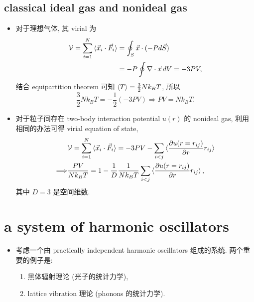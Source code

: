 \subsection{classical ideal gas and nonideal gas}
\begin{itemize}
	\item 对于理想气体, 其 virial 为
	\begin{align}
		\mathcal{V} = \sum_{i = 1}^N \braket{\vec{x}_i \cdot \vec{F}_i} &= \oint_S \vec{x} \cdot (- P d\vec{S}) \notag \\
		&= - P \oint \nabla \cdot \vec{x} \, dV = - 3 P V,
	\end{align}
	结合 equipartition theorem 可知 $\braket{T} = \frac{3}{2} N k_B T$, 所以
	\begin{equation}
		\frac{3}{2} N k_B T = - \frac{1}{2} (- 3 P V) \Longrightarrow P V = N k_B T.
	\end{equation}
	
	\item 对于粒子间存在 two-body interaction potential $u(r)$ 的 nonideal gas, 利用相同的办法可得 virial equation of state,
	\begin{align}
		& \mathcal{V} = \sum_{i = 1}^N \braket{\vec{x}_i \cdot \vec{F}_i} = - 3 P V - \sum_{i < j} \braket{\frac{\partial u(r = r_{i j})}{\partial r} r_{i j}} \notag \\
		\Longrightarrow & \frac{P V}{N k_B T} = 1 - \frac{1}{D} \frac{1}{N k_B T} \sum_{i < j} \braket{\frac{\partial u(r = r_{i j})}{\partial r} r_{i j}},
	\end{align}
	其中 $D = 3$ 是空间维数.
\end{itemize}

\section{a system of harmonic oscillators}
\begin{itemize}
	\item 考虑一个由 practically independent harmonic oscillators 组成的系统. 两个重要的例子是:
	\begin{enumerate}
		\item 黑体辐射理论 (光子的统计力学),
		
		\item lattice vibration 理论 (phonons 的统计力学).
	\end{enumerate}
\end{itemize}

